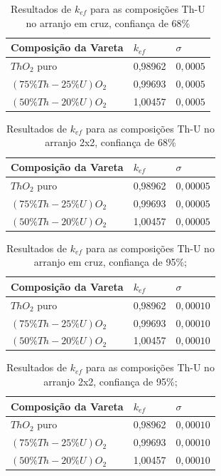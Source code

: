\documentclass[
	12pt,				%
	openany,			%
	twoside,			%
	a4paper,			%
	english,			%
	french,				%
	spanish,			%
	brazil				%
	]{abntex2}
\begin{document}
\begin{center}
\begin{longtable}{|l|l|l|}
\caption[Resultados de $k_{ef}$ para as composições Th-U no arranjo em cruz, confiança de 68\%;]{Resultados de $k_{ef}$ para as composições Th-U no arranjo em cruz, confiança de 68\%}
\label{cross68} \\
\hline 
Composição da Vareta & $k_{ef}$ & $\sigma$\tabularnewline
\hline 
\hline 
$ThO_{2}$ puro & 0,98962 & $0,0005$ \tabularnewline
\hline 
 $(75\%Th-25\%U)O_{2}$ & 0,99693 & $0,0005$ \tabularnewline
\hline 
 $(50\%Th-20\%U)O_{2}$ & 1,00457 & $0,0005$ \tabularnewline
\hline 
\end{longtable}

\begin{longtable}{|l|l|l|}
\caption[Resultados de $k_{ef}$ para as composições Th-U no arranjo 2x2, confiança de 68\%;]{Resultados de $k_{ef}$ para as composições Th-U no arranjo 2x2, confiança de 68\%}
\label{2x2_68} \\
\hline 
Composição da Vareta & $k_{ef}$ & $\sigma$\tabularnewline
\hline 
\hline 
$ThO_{2}$ puro & 0,98962 & $0,00005$ \tabularnewline
\hline 
 $(75\%Th-25\%U)O_{2}$ & 0,99693 & $0,00005$ \tabularnewline
\hline 
 $(50\%Th-20\%U)O_{2}$ & 1,00457 & $0,00005$ \tabularnewline
\hline 
\end{longtable}

\begin{longtable}{|l|l|l|}
\caption[Resultados de $k_{ef}$ para as composições Th-U no arranjo em cruz, confiança de 95\%;]{Resultados de $k_{ef}$ para as composições Th-U no arranjo em cruz, confiança de 95\%;}
\label{cross95} \\
\hline 
Composição da Vareta & $k_{ef}$ & $\sigma$\tabularnewline
\hline 
\hline 
$ThO_{2}$ puro & 0,98962 & $0,00010$ \tabularnewline
\hline 
 $(75\%Th-25\%U)O_{2}$ & 0,99693 & $0,00010$ \tabularnewline
\hline 
 $(50\%Th-20\%U)O_{2}$ & 1,00457 & $0,00010$ \tabularnewline
\hline 
\end{longtable}

\begin{longtable}{|l|l|l|}
\caption[Resultados de $k_{ef}$ para as composições Th-U no arranjo 2x2, confiança de 95\%;]{Resultados de $k_{ef}$ para as composições Th-U no arranjo 2x2, confiança de 95\%;}
\label{2x2_95} \\
\hline 
Composição da Vareta & $k_{ef}$ & $\sigma$\tabularnewline
\hline 
\hline 
$ThO_{2}$ puro & 0,98962 & $0,00010$ \tabularnewline
\hline 
 $(75\%Th-25\%U)O_{2}$ & 0,99693 & $0,00010$ \tabularnewline
\hline 
 $(50\%Th-20\%U)O_{2}$ & 1,00457 & $0,00010$ \tabularnewline
\hline 
\end{longtable}


\end{center}
\end{document}
